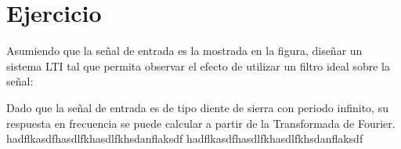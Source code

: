 \section*{Ejercicio}
    Asumiendo que la señal de entrada es la mostrada en la figura, diseñar un sistema LTI tal que permita observar el efecto de utilizar un filtro ideal sobre la señal:
     
    \begin{figure}[H]
        \centering
    \end{figure}
    
    Dado que la señal de entrada es de tipo diente de sierra con periodo infinito, su respuesta en frecuencia se puede calcular a partir de la Transformada de Fourier. hadflkasdfhasdlfkhasdlfkhsdanflaksdf hadflkasdfhasdlfkhasdlfkhsdanflaksdf  

